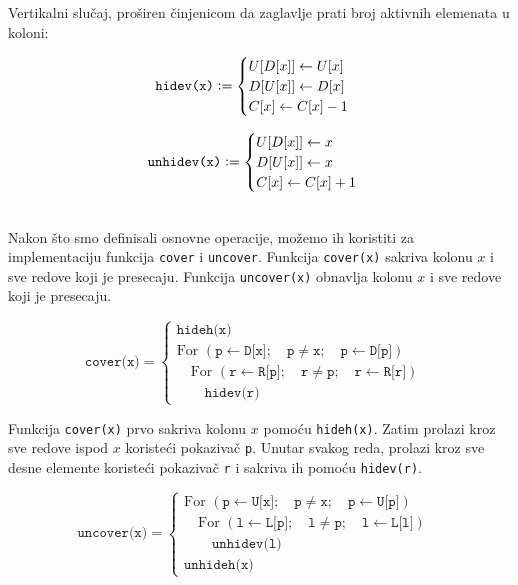 \documentclass[a4paper]{article}
\begin{document}
{Vertikalni slučaj, proširen činjenicom da zaglavlje prati broj aktivnih elemenata u koloni:\\
  \begin{minipage}{0.45\textwidth}
  \[
  \texttt{hidev(x)} \vcentcolon =
  \begin{cases}
    U[D[x]] \gets U[x] \\
    D[U[x]] \gets D[x] \\
    C[x] \gets C[x] - 1
  \end{cases}
  \]
\end{minipage}
\begin{minipage}{0.45\textwidth}
  \[
  \texttt{unhidev(x)} \vcentcolon =
  \begin{cases}
    U[D[x]] \gets x \\
    D[U[x]] \gets x \\
    C[x] \gets C[x] + 1
  \end{cases}
  \]
  \end{minipage}\\

  Nakon što smo definisali osnovne operacije, možemo ih koristiti za implementaciju funkcija \texttt{cover} i
  \texttt{uncover}. Funkcija \texttt{cover(x)} sakriva kolonu \(x\) i sve redove koji je presecaju. Funkcija
  \texttt{uncover(x)} obnavlja kolonu \(x\) i sve redove koji je presecaju.

  \[
  \texttt{cover(x)} =
  \begin{cases}
  \texttt{hideh(x)} & \\
  \text{For } (\texttt{p} \gets \texttt{D[x]}; \quad \texttt{p} \neq \texttt{x}; \quad \texttt{p} \gets \texttt{D[p]}) & \\
  \quad \text{For } (\texttt{r} \gets \texttt{R[p]}; \quad \texttt{r} \neq \texttt{p}; \quad \texttt{r} \gets \texttt{R[r]}) & \\
  \quad \quad \texttt{hidev(r)} &
  \end{cases}
  \]
  
  Funkcija \texttt{cover(x)} prvo sakriva kolonu \(x\) pomoću \texttt{hideh(x)}. Zatim prolazi kroz sve redove ispod
  \(x\) koristeći pokazivač \texttt{p}. Unutar svakog reda, prolazi kroz sve desne elemente koristeći pokazivač
  \texttt{r} i sakriva ih pomoću \texttt{hidev(r)}.
  
  \[
  \texttt{uncover(x)} =
  \begin{cases}
  \text{For } (\texttt{p} \gets \texttt{U[x]}; \quad \texttt{p} \neq \texttt{x}; \quad \texttt{p} \gets \texttt{U[p]}) & \\
  \quad \text{For } (\texttt{l} \gets \texttt{L[p]}; \quad \texttt{l} \neq \texttt{p}; \quad \texttt{l} \gets \texttt{L[l]}) & \\
  \quad \quad \texttt{unhidev(l)} & \\
  \texttt{unhideh(x)} &
  \end{cases}
  \]
  
}
\end{document}
